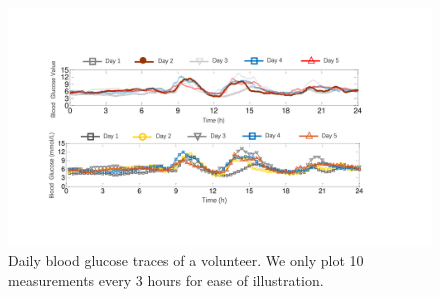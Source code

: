 \begin{figure}[t]
  \centering
  \includegraphics[width=1\columnwidth]{./img/historical_trend2.pdf}
  \caption{Daily blood glucose traces of a volunteer. We only plot 10 measurements every 3 hours for ease of illustration.}
  \label{fig:historical_traces}
\end{figure}


